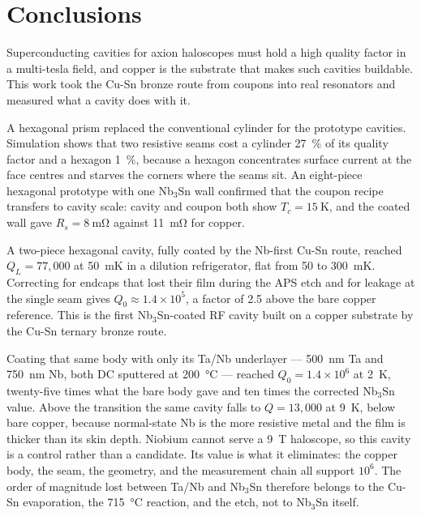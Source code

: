 \section{Conclusions}

Superconducting cavities for axion haloscopes must hold a high quality factor in a multi-tesla field, and copper is the substrate that makes such cavities buildable. This work took the Cu-Sn bronze route from coupons into real resonators and measured what a cavity does with it.

A hexagonal prism replaced the conventional cylinder for the prototype cavities. Simulation shows that two resistive seams cost a cylinder \qty{27}{\percent} of its quality factor and a hexagon \qty{1}{\percent}, because a hexagon concentrates surface current at the face centres and starves the corners where the seams sit. An eight-piece hexagonal prototype with one Nb$_3$Sn wall confirmed that the coupon recipe transfers to cavity scale: cavity and coupon both show $T_c = \qty{15}{\kelvin}$, and the coated wall gave $R_s = \qty{8}{\milli\ohm}$ against \qty{11}{\milli\ohm} for copper.

A two-piece hexagonal cavity, fully coated by the Nb-first Cu-Sn route, reached $Q_L = 77{,}000$ at \qty{50}{\milli\kelvin} in a dilution refrigerator, flat from \qty{50}{} to \qty{300}{\milli\kelvin}. Correcting for endcaps that lost their film during the APS etch and for leakage at the single seam gives $Q_0 \approx 1.4\times10^{5}$, a factor of \num{2.5} above the bare copper reference. This is the first Nb$_3$Sn-coated RF cavity built on a copper substrate by the Cu-Sn ternary bronze route.

Coating that same body with only its Ta/Nb underlayer --- \qty{500}{\nano\meter} Ta and \qty{750}{\nano\meter} Nb, both DC sputtered at \qty{200}{\degreeCelsius} --- reached $Q_0 = 1.4\times10^{6}$ at \qty{2}{\kelvin}, twenty-five times what the bare body gave and ten times the corrected Nb$_3$Sn value. Above the transition the same cavity falls to $Q = 13{,}000$ at \qty{9}{\kelvin}, below bare copper, because normal-state Nb is the more resistive metal and the film is thicker than its skin depth. Niobium cannot serve a \qty{9}{\tesla} haloscope, so this cavity is a control rather than a candidate. Its value is what it eliminates: the copper body, the seam, the geometry, and the measurement chain all support $10^{6}$. The order of magnitude lost between Ta/Nb and Nb$_3$Sn therefore belongs to the Cu-Sn evaporation, the \qty{715}{\degreeCelsius} reaction, and the etch, not to Nb$_3$Sn itself.

